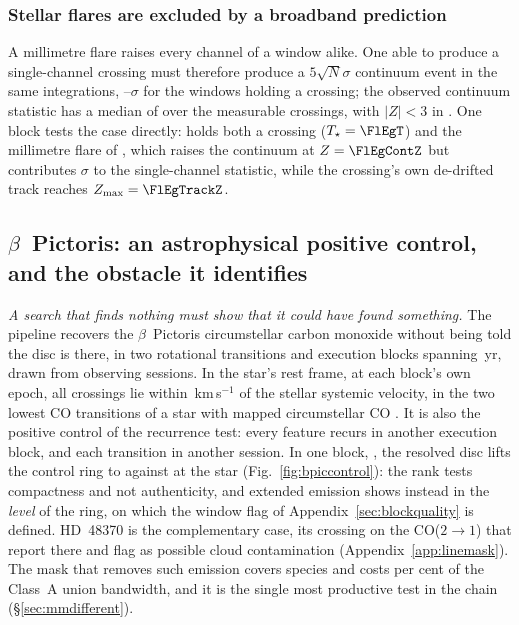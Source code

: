 \subsubsection{Stellar flares are excluded by a broadband prediction}

A millimetre flare raises every channel of a window alike. One able to
produce a single-channel crossing must therefore produce a $5\sqrt{N}\sigma$ continuum
event in the same integrations, \FlPredLo--\FlPredHi$\sigma$ for the windows
holding a crossing; the observed continuum statistic has a median of
\FlObsMed{} over the \FlNCont{} measurable crossings, with $|Z|<3$ in
\FlNQuiet. One block tests the case directly:
\FlEgStar{} \texttt{\FlEgEb} holds both a crossing ($T_\star=\FlEgT$) and the
millimetre flare of \citet{MacGregor2020}, which raises the continuum at
$Z=\FlEgContZ$ but contributes \FlEgContrib$\sigma$ to the single-channel
statistic, while the crossing's own de-drifted track reaches
$Z_{\max}=\FlEgTrackZ$.

\subsection{$\beta$~Pictoris: an astrophysical positive control, and the
obstacle it identifies} \label{sec:bpicval}

\emph{A search that finds nothing must show that it could have found
something.} The pipeline recovers the $\beta$~Pictoris circumstellar carbon
monoxide without being told the disc is there, in two rotational transitions
and \CsBpCoBlocks{} execution blocks spanning \BpBaselineYr\,yr, drawn from
\CsBpCoSess{} observing sessions. In the star's rest frame, at each block's own
epoch, all \BpicPanelNCo{} crossings lie within \BpicDvCoHi\,km\,s$^{-1}$ of the stellar
systemic velocity, in the two lowest CO transitions of a star with mapped
circumstellar CO \citep{Dent2014,Matra2017}. It is also the positive control of the recurrence test: every feature recurs
in another execution block, and each transition in another session.
In one block, \texttt{\BpCtrlBlock}, the resolved disc lifts the control ring
to \BpCtrlRingMax{} against \BpCtrlStar{} at the star
(Fig.~\ref{fig:bpiccontrol}): the rank tests compactness and not
authenticity, and extended emission shows instead in the \emph{level} of the
ring, on which the window flag of Appendix~\ref{sec:blockquality} is
defined.
HD~48370 is the complementary case, its crossing on the CO($2{\to}1$) that
\citet{Cataldi2023} report there and flag as possible cloud contamination
(Appendix~\ref{app:linemask}). The mask that removes such emission covers \FrNSpec{} species and costs
\MkMaskAPct{} per cent of the Class~A union bandwidth, and it is the single
most productive test in the chain (\S\ref{sec:mmdifferent}).

